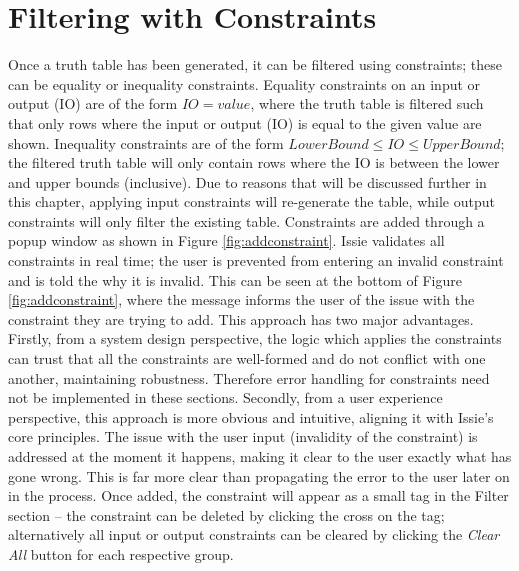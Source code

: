 \section{Filtering with Constraints}
Once a truth table has been generated, it can be filtered using constraints; these can be equality or inequality constraints. Equality constraints on an input or output (IO) are of the form $IO = value$, where the truth table is filtered such that only rows where the input or output (IO) is equal to the given value are shown. Inequality constraints are of the form $LowerBound \leq IO \leq UpperBound$; the filtered truth table will only contain rows where the IO is between the lower and upper bounds (inclusive). Due to reasons that will be discussed further in this chapter, applying input constraints will re-generate the table, while output constraints will only filter the existing table. 
Constraints are added through a popup window as shown in Figure \ref{fig:addconstraint}. Issie validates all constraints in real time; the user is prevented from entering an invalid constraint and is told the why it is invalid. This can be seen at the bottom of Figure \ref{fig:addconstraint}, where the message informs the user of the issue with the constraint they are trying to add. This approach has two major advantages. Firstly, from a system design perspective, the logic which applies the constraints can trust that all the constraints are well-formed and do not conflict with one another, maintaining robustness. Therefore error handling for constraints need not be implemented in these sections. Secondly, from a user experience perspective, this approach is more obvious and intuitive, aligning it with Issie's core principles. The issue with the user input (invalidity of the constraint) is addressed at the moment it happens, making it clear to the user exactly what has gone wrong. This is far more clear than propagating the error to the user later on in the process.
Once added, the constraint will appear as a small tag in the Filter section -- the constraint can be deleted by clicking the cross on the tag; alternatively all input or output constraints can be cleared by clicking the \textit{Clear All} button for each respective group.
